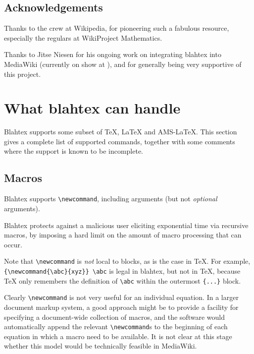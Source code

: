 \documentclass{article}
\newcommand{\texcommand}[1]{\textbackslash{}#1}
\begin{document}
\subsection{Acknowledgements}

Thanks to the crew at Wikipedia, for pioneering such a fabulous resource, especially the regulars at WikiProject Mathematics.

Thanks to Jitse Niesen for his ongoing work on integrating blahtex into MediaWiki (currently on show at ), and for generally being very supportive of this project.

\section{What blahtex can handle}\label{sec:handle}

Blahtex supports some subset of \TeX{}, \LaTeX{} and AMS-\LaTeX{}. This section gives a complete list of supported commands, together with some comments where the support is known to be incomplete.

\subsection{Macros}

Blahtex supports \texttt{\texcommand{newcommand}}, including arguments (but not \emph{optional} arguments).

Blahtex protects against a malicious user eliciting exponential time via recursive macros, by imposing a hard limit on the amount of macro processing that can occur.

Note that \texttt{\texcommand{newcommand}} is \emph{not} local to blocks, as is the case in \TeX{}. For example, \texttt{\{\texcommand{newcommand}\{\texcommand{abc}\}\{xyz\}\}  \texcommand{abc}} is legal in blahtex, but not in \TeX{}, because \TeX{} only remembers the definition of \texttt{\texcommand{abc}} within the outermost \texttt{\{...\}} block.

Clearly \texttt{\texcommand{newcommand}} is not very useful for an individual equation. In a larger document markup system, a good approach might be to provide a facility for specifying a document-wide collection of macros, and the software would automatically append the relevant \texttt{\texcommand{newcommand}}s to the beginning of each equation in which a macro need to be available. It is not clear at this stage whether this model would be technically feasible in MediaWiki.
\end{document}
